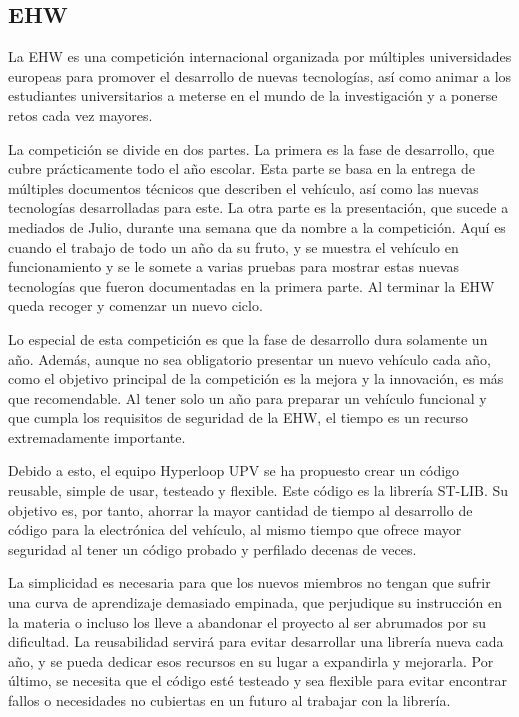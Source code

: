 \documentclass{report}
\begin{document}
\subsection{EHW}
La EHW es una competición internacional organizada por múltiples universidades europeas para promover el desarrollo de nuevas tecnologías, así como animar a los estudiantes universitarios a meterse en el mundo de la investigación y a ponerse retos cada vez mayores. \par
La competición se divide en dos partes. La primera es la fase de desarrollo, que cubre prácticamente todo el año escolar. Esta parte se basa en la entrega de múltiples documentos técnicos que describen el vehículo, así como las nuevas tecnologías desarrolladas para este. La otra parte es la presentación, que sucede a mediados de Julio, durante una semana que da nombre a la competición. Aquí es cuando el trabajo de todo un año da su fruto, y se muestra el vehículo en funcionamiento y se le somete a varias pruebas para mostrar estas nuevas tecnologías que fueron documentadas en la primera parte. Al terminar la EHW queda recoger y comenzar un nuevo ciclo. 
\par \vspace{0.3 cm}
Lo especial de esta competición es que la fase de desarrollo dura solamente un año. Además, aunque no sea obligatorio presentar un nuevo vehículo cada año, como el objetivo principal de la competición es la mejora y la innovación, es más que recomendable. Al tener solo un año para preparar un vehículo funcional y que cumpla los requisitos de seguridad de la EHW, el tiempo es un recurso extremadamente importante. \par \vspace{0.3 cm}
Debido a esto, el equipo Hyperloop UPV se ha propuesto crear un código reusable, simple de usar, testeado y flexible. Este código es la librería ST-LIB. Su objetivo es, por tanto, ahorrar la mayor cantidad de tiempo al desarrollo de código para la electrónica del vehículo, al mismo tiempo que ofrece mayor seguridad al tener un código probado y perfilado decenas de veces. \par
La simplicidad es necesaria para que los nuevos miembros no tengan que sufrir una curva de aprendizaje demasiado empinada, que perjudique su instrucción en la materia o incluso los lleve a abandonar el proyecto al ser abrumados por su dificultad. La reusabilidad servirá para evitar desarrollar una librería nueva cada año, y se pueda dedicar esos recursos en su lugar a expandirla y mejorarla. Por último, se necesita que el código esté testeado y sea flexible para evitar encontrar fallos o necesidades no cubiertas en un futuro al trabajar con la librería. 
\end{document}
